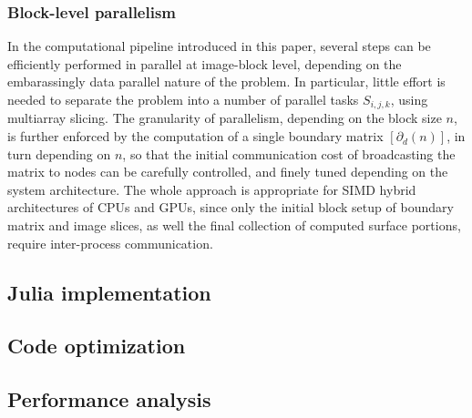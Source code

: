 \subsubsection{Block-level parallelism}\label{sec:bbbb}

In the computational pipeline introduced in this paper, several steps can be efficiently performed in parallel at image-block level, depending on the embarassingly data parallel nature of the problem. In particular, little effort is needed to separate the problem into a number of parallel tasks $S_{i,j,k}$, using multiarray slicing. The granularity of parallelism, depending on the block size $n$, is further enforced by the computation of a single boundary matrix $[\partial_d(n)]$, in turn depending on $n$, so that the initial communication cost of broadcasting the matrix to nodes can be carefully controlled, and finely tuned depending on the system architecture. The whole approach is appropriate  for SIMD hybrid architectures of CPUs and GPUs, since only the initial block setup of boundary matrix and image slices, as well the final collection of computed surface portions, require inter-process communication.









\subsection{Julia implementation}\label{sec:implementation}


\subsection{Code optimization}\label{sec:optimization}


\subsection{Performance analysis}\label{sec:analysis}

